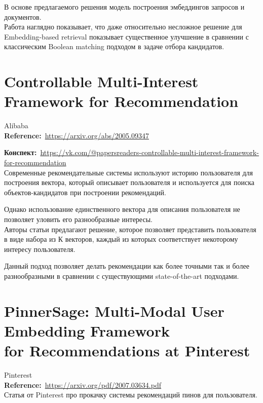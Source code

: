 \begin{bibunit}[plainnat]
В основе предлагаемого решения модель построения эмбеддингов запросов и документов. \\

Работа наглядно показывает, что даже относительно несложное решение для Embedding-based retrieval показывает существенное улучшение в сравнении с классическим Boolean matching подходом в задаче отбора кандидатов.

\section*{Controllable Multi-Interest Framework for Recommendation}

Alibaba \\

\textbf{Reference:}~\url{https://arxiv.org/abs/2005.09347}

\textbf{Конспект:}~\url{https://vk.com/@papersreaders-controllable-multi-interest-framework-for-recommendation} \\

Современные рекомендательные системы используют историю пользователя для построения вектора, который описывает пользователя и используется для поиска объектов-кандидатов при построении рекомендаций. 

Однако использование единственного вектора для описания пользователя не позволяет уловить его разнообразные интересы. \\

Авторы статьи предлагают решение, которое позволяет представить пользователя в виде набора из К векторов, каждый из которых соответствует некоторому интересу пользователя.

Данный подход позволяет делать рекомендации как более точными так и более разнообразными в сравнении с существующими state-of-the-art подходами.

\section*{PinnerSage: Multi-Modal User Embedding Framework \\ for Recommendations at Pinterest}

Pinterest \\

\textbf{Reference:}~\url{https://arxiv.org/pdf/2007.03634.pdf} \\

Статья от Pinterest про прокачку системы рекомендаций пинов для пользователя. \\


\end{bibunit}
